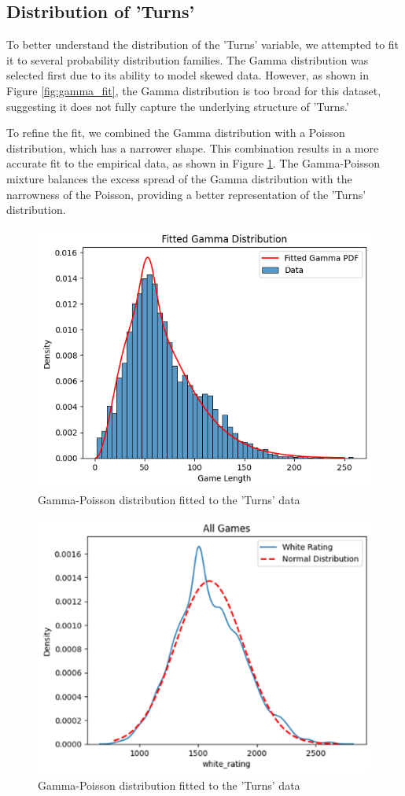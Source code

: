\documentclass[conference]{IEEEtran}
\begin{document}
\subsection{Distribution of 'Turns'}

To better understand the distribution of the 'Turns' variable, we attempted to fit it to several probability distribution families. The Gamma distribution was selected first due to its ability to model skewed data. However, as shown in Figure \ref{fig:gamma_fit}, the Gamma distribution is too broad for this dataset, suggesting it does not fully capture the underlying structure of 'Turns.'

To refine the fit, we combined the Gamma distribution with a Poisson distribution, which has a narrower shape. This combination results in a more accurate fit to the empirical data, as shown in Figure \ref{fig:gam_poi_fit}. The Gamma-Poisson mixture balances the excess spread of the Gamma distribution with the narrowness of the Poisson, providing a better representation of the 'Turns' distribution.



\begin{figure}[H]
    \centering
    \includegraphics[width=0.8\linewidth]{gam_poi_fit.png}
    \caption{Gamma-Poisson distribution fitted to the 'Turns' data}
    \label{fig:gam_poi_fit}
\end{figure}

\begin{figure}[H]
    \centering
    \includegraphics[width=0.8\linewidth]{allgames.png}
    \caption{Gamma-Poisson distribution fitted to the 'Turns' data}
    \label{fig:all_games}
\end{figure}
\end{document}
